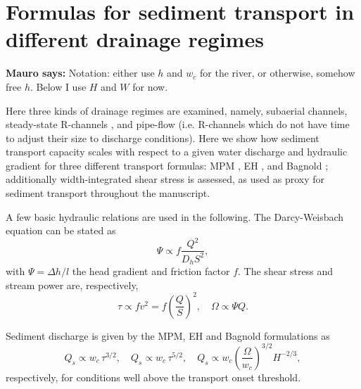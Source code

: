 \documentclass[draft]{agujournal2019}
\newcommand{\mauro}[1]{{\textbf{\color{green}Mauro says:} \color{green} #1} }
\begin{document}
\newpage
\section{Formulas for sediment transport in different drainage regimes}
\label{sect:scaling}

\mauro{Notation: either use $h$ and $w_c$ for the river, or otherwise, somehow free $h$. Below I use $H$ and $W$ for now.}

Here three kinds of drainage regimes are examined, namely, subaerial channels, steady-state R-channels \cite{rothlisberger1972}, and pipe-flow (i.e. R-channels which do not have time to adjust their size to discharge conditions).
Here we show how sediment transport capacity scales with respect to a given water discharge and hydraulic gradient for three different transport formulas: MPM \cite{meyer1948}, EH \cite{engelund1967}, and Bagnold \cite{bagnold1980}; additionally width-integrated shear stress is assessed, as used as proxy for sediment transport throughout the manuscript.

A few basic hydraulic relations are used in the following.
The Darcy-Weisbach equation can be stated as
\begin{equation}
  \label{eq:DW}
  \Psi \propto f\frac{Q^2}{D_h S^2},
\end{equation}
with $\Psi = \Delta h / l$ the head gradient and friction factor $f$.
The shear stress and stream power are, respectively,
\begin{equation}
    \label{eq:tau-omega}
  \tau \propto f v^2 = f \left(\frac{Q}{S}\right)^2, \quad  \Omega \propto \Psi Q.
\end{equation}
%

Sediment discharge is given by the MPM, EH and Bagnold formulations as
\begin{equation}
  Q_s \propto w_c\, \tau^{3/2}, \quad Q_s \propto w_c\, \tau^{5/2}, \quad Q_s \propto w_c \left(\frac{\Omega}{w_c}\right)^{3/2} H^{-2/3},
\end{equation}
respectively, for conditions well above the transport onset threshold.
\end{document}
